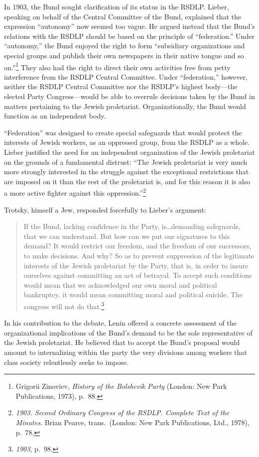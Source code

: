 In 1903, the Bund sought clarification of its status in the RSDLP. Lieber, speaking on behalf of the Central Committee of the Bund, explained that the expression ``autonomy'' now seemed too vague. He argued instead that the Bund's relations with the RSDLP should be based on the principle of ``federation.'' Under ``autonomy,'' the Bund enjoyed the right to form ``subsidiary organizations and special groups and publish their own newspapers in their native tongue and so on.''\footnote{Grigorii Zinoviev, \emph{History of the Bolshevik Party} (London: New Park Publications, 1973), p.\ 88.} They also had the right to direct their own activities free from petty interference from the RSDLP Central Committee. Under ``federation,'' however, neither the RSDLP Central Committee nor the RSDLP's highest body---the elected Party Congress---would be able to overrule decisions taken by the Bund in matters pertaining to the Jewish proletariat. Organizationally, the Bund would function as an independent body.

``Federation'' was designed to create special safeguards that would protect the interests of Jewish workers, as an oppressed group, from the RSDLP as a whole. Lieber justified the need for an independent organization of the Jewish proletariat on the grounds of a fundamental distrust: ``The Jewish proletariat is very much more strongly interested in the struggle against the exceptional restrictions that are imposed on it than the rest of the proletariat is, and for this reason it is also a more active fighter against this oppression.''\footnote{\emph{1903. Second Ordinary Congress of the RSDLP. Complete Text of the Minutes.} Brian Pearce, trans.\ (London: New Park Publications, Ltd., 1978), p.\ 78.}

Trotsky, himself a Jew, responded forcefully to Lieber's argument:

\blockquote{If the Bund, lacking confidence in the Party, is\ldots demanding safeguards, that we can understand. But how can we put our signatures to this demand? It would restrict our freedom, and the freedom of our successors, to make decisions. And why? So as to prevent suppression of the legitimate interests of the Jewish proletariat by the Party, that is, in order to insure ourselves against committing an act of betrayal. To accept such conditions would mean that we acknowledged our own moral and political bankruptcy, it would mean committing moral and political suicide. The congress will not do that.\footnote{\emph{1903}, p.\ 98.}}

In his contribution to the debate, Lenin offered a concrete assessment of the organizational implications of the Bund's demand to be the sole representative of the Jewish proletariat. He believed that to accept the Bund's proposal would amount to internalizing within the party the very divisions among workers that class society relentlessly seeks to impose.

